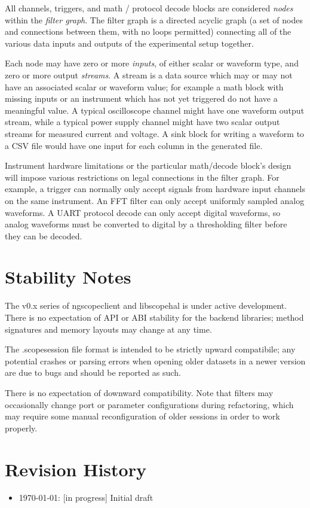 All channels, triggers, and math / protocol decode blocks are considered \emph{nodes} within the \emph{filter graph}.
The filter graph is a directed acyclic graph (a set of nodes and connections between them, with no loops permitted)
connecting all of the various data inputs and outputs of the experimental setup together.

Each node may have zero or more \emph{inputs}, of either scalar or waveform type, and zero or more output
\emph{streams}. A stream is a data source which may or may not have an associated scalar or waveform value; for example
a math block with missing inputs or an instrument which has not yet triggered do not have a meaningful value. A typical
oscilloscope channel might have one waveform output stream, while a typical power supply channel might have two scalar
output streams for measured current and voltage. A sink block for writing a waveform to a CSV file would have one input
for each column in the generated file.

Instrument hardware limitations or the particular math/decode block's design will impose various restrictions on legal
connections in the filter graph. For example, a trigger can normally only accept signals from hardware input channels
on the same instrument. An FFT filter can only accept uniformly sampled analog waveforms. A UART protocol decode can
only accept digital waveforms, so analog waveforms must be converted to digital by a thresholding filter before they
can be decoded.

\section{Stability Notes}

The v0.x series of ngscopeclient and libscopehal is under active development. There is no expectation of API or ABI
stability for the backend libraries; method signatures and memory layouts may change at any time.

The .scopesession file format is intended to be strictly upward compatibile; any potential crashes or parsing errors
when opening older datasets in a newer version are due to bugs and should be reported as such.

There is no expectation of downward compatibility. Note that filters may occasionally change port or parameter
configurations during refactoring, which may require some manual reconfiguration of older sessions in order to work
properly.

\section{Revision History}
\begin{itemize}
\item \today: [in progress] Initial draft
\end{itemize}
